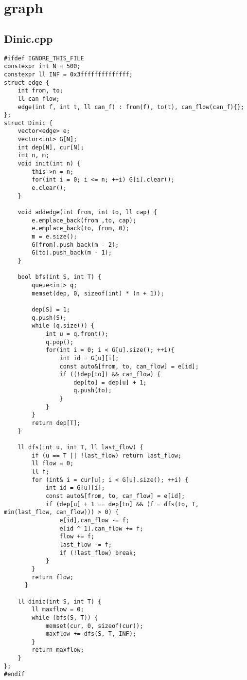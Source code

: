 \documentclass[UTF8, a4paper, titlepage, twoside]{ctexart}
\begin{document}
\clearpage
\section{graph}
\subsection{Dinic.cpp}
\begin{verbatim}
#ifdef IGNORE_THIS_FILE
constexpr int N = 500;
constexpr ll INF = 0x3ffffffffffffff;
struct edge {
    int from, to;
    ll can_flow;
    edge(int f, int t, ll can_f) : from(f), to(t), can_flow(can_f){};
};
struct Dinic {
    vector<edge> e;
    vector<int> G[N];
    int dep[N], cur[N];  
    int n, m;
    void init(int n) {
        this->n = n;
        for(int i = 0; i <= n; ++i) G[i].clear();
        e.clear();
    }
  
    void addedge(int from, int to, ll cap) {
        e.emplace_back(from ,to, cap);
        e.emplace_back(to, from, 0);
        m = e.size();
        G[from].push_back(m - 2);
        G[to].push_back(m - 1);
    }
  
    bool bfs(int S, int T) {
        queue<int> q;
        memset(dep, 0, sizeof(int) * (n + 1));
  
        dep[S] = 1;
        q.push(S);
        while (q.size()) {
            int u = q.front();
            q.pop();
            for(int i = 0; i < G[u].size(); ++i){
                int id = G[u][i];
                const auto&[from, to, can_flow] = e[id];
                if ((!dep[to]) && can_flow) {
                    dep[to] = dep[u] + 1;
                    q.push(to);
                }
            }
        }
        return dep[T];
    }
  
    ll dfs(int u, int T, ll last_flow) {
        if (u == T || !last_flow) return last_flow;
        ll flow = 0;
        ll f;
        for (int& i = cur[u]; i < G[u].size(); ++i) {
            int id = G[u][i];
            const auto&[from, to, can_flow] = e[id];
            if (dep[u] + 1 == dep[to] && (f = dfs(to, T, min(last_flow, can_flow))) > 0) {
                e[id].can_flow -= f;
                e[id ^ 1].can_flow += f;
                flow += f;
                last_flow -= f;
                if (!last_flow) break;
            }
        }
        return flow;
      }
  
    ll dinic(int S, int T) {
        ll maxflow = 0;
        while (bfs(S, T)) {
            memset(cur, 0, sizeof(cur));
            maxflow += dfs(S, T, INF);
        }
        return maxflow;
    }
};
#endif
\end{verbatim}
\end{document}
